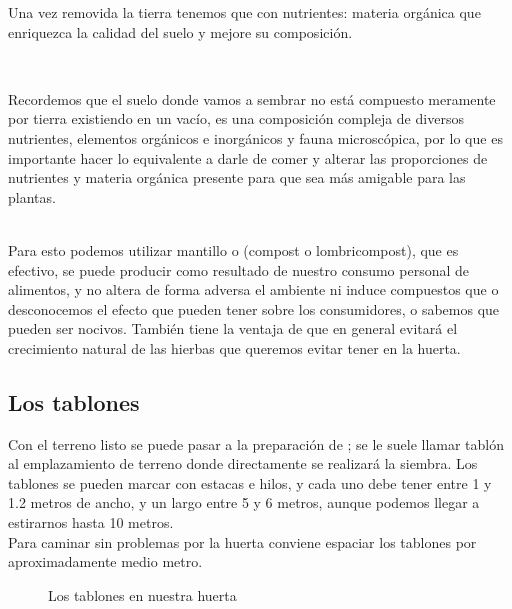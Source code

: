 \documentclass[../main.tex]{subfiles}
\begin{document}
Una vez removida la tierra tenemos que  con nutrientes: materia orgánica que enriquezca la calidad del suelo y mejore su composición. 

\hfill\\

\begin{recuadroV}
    Recordemos que el suelo donde vamos a sembrar no está compuesto meramente por tierra existiendo en un vacío, es una composición compleja de diversos nutrientes, elementos orgánicos e inorgánicos y fauna microscópica, por lo que es importante hacer lo equivalente a darle de comer y alterar las proporciones de nutrientes y materia orgánica presente para que sea más amigable para las plantas.
\end{recuadroV}

\hfill\\

Para esto podemos utilizar mantillo o  (compost o lombricompost), que es efectivo, se puede producir como resultado de nuestro consumo personal de alimentos, y no altera de forma adversa el ambiente ni induce compuestos que o desconocemos el efecto que pueden tener sobre los consumidores, o sabemos que pueden ser nocivos. También tiene la ventaja de que en general evitará el crecimiento natural de las hierbas que queremos evitar tener en la huerta. \\

\subsection{Los tablones}


Con el terreno listo se puede pasar a la preparación de ; se le suele llamar tablón al emplazamiento de terreno donde directamente se realizará la siembra. Los tablones se pueden marcar con estacas e hilos, y cada uno debe tener entre 1 y 1.2 metros de ancho, y un largo entre 5 y 6 metros, aunque podemos llegar a estirarnos hasta 10 metros. \\
Para caminar sin problemas por la huerta conviene espaciar los tablones por aproximadamente medio metro. 



\begin{wrapfigure}[13]{o}[0cm]{0.45\textwidth}
    \centering
    \caption*{\color{CompostGreen!50!black}Los tablones en nuestra huerta}
    \label{tablones1}
\end{wrapfigure}
\end{document}
